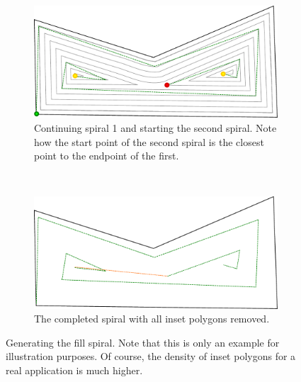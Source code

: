 \documentclass[10pt,twoside,a4paper]{report}
\begin{document}
\begin{figure}[htbp]
\begin{subfigure}[b]{0.45\textwidth}
    \end{subfigure}
        \begin{subfigure}[b]{0.45\textwidth}
    		\includegraphics[width=\textwidth]{images/algorithms/spiral_fill/after_done_2.pdf}
    		\caption{Continuing spiral 1 and starting the second spiral. Note how the start point of the second spiral is the closest point to the endpoint of the first.} \label{splitevent}
    \end{subfigure}
\\
        \begin{subfigure}[b]{0.45\textwidth}
    		\includegraphics[width=\textwidth]{images/algorithms/spiral_fill/complete_done.pdf}
    		\caption{The completed spiral with all inset polygons removed.}
    \end{subfigure}
	\caption{Generating the fill spiral. Note that this is only an example for illustration purposes. Of course, the density of inset polygons for a real application is much higher.} \label{fig:insetting}
\end{figure}
\end{document}
